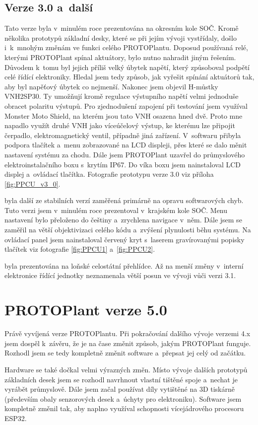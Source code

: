 \subsection{Verze 3.0 a~další}
Tato verze byla v~minulém roce prezentována na okresním kole SOČ.
Kromě několika prototypů základní desky, které se při jejím vývoji vystřídaly, došlo i~k~mnohým změnám ve funkci celého PROTOPlantu.
Doposud používaná relé, kterými PROTOPlant spínal aktuátory, bylo nutno nahradit jiným řešením.
Důvodem k~tomu byl jejich příliš velký úbytek napětí, který způso\-bo\-val podpětí celé řídící elektroniky.
Hledal jsem tedy způsob, jak vyřešit spínání aktuátorů tak, aby byl napěťový úbytek co nejmenší.
Nakonec jsem objevil H-můstky VNH2SP30. 
Ty umožňují kromě regulace výstupního napětí velmi jednoduše obracet polaritu výstupů.
Pro zjednodušení zapojení při testování jsem využíval Monster Moto Shield, na kterém jsou tato VNH osazena hned dvě.
Proto mne napadlo využít druhé VNH jako víceúčelový výstup, ke kterému lze připojit čerpadlo, elektromagnetický ventil, případně jiná zařízení.
V~softwaru přibyla podpora tlačítek a~menu zobrazované na LCD displeji, přes které se dalo měnit nastavení systému za chodu.
Dále jsem PROTOPlant uzavřel do průmyslového elektroinstalačního boxu s~krytím IP67.
Do víka boxu jsem nainstaloval LCD displej a~ovládací tlačítka.
Fotografie prototypu verze 3.0 viz příloha \ref{fig:PPCU_v3_0}.
\newline

\noindent{} byla další ze stabilních verzí zaměřená primárně na opravu softwarových chyb.
Tuto verzi jsem v~minulém roce prezentoval v~krajském kole SOČ.
Menu nastavení bylo přeloženo do češtiny a~zrychlena navigace v~něm.
Dále jsem se zaměřil na větší objektivizaci celého kódu a~zvýšení plynulosti běhu systému.
Na ovládací panel jsem nainstaloval červený kryt s~laserem gravírovanými popisky tlačítek viz fotografie \ref{fig:PPCU1} a~\ref{fig:PPCU2}.
\newline

\noindent{} byla prezentována na loňské celostátní přehlídce.
Až na menší změny v~interní elektronice řídící jednotky neznamenala větší posun ve vývoji vůči verzi 3.1.

\section{PROTOPlant verze 5.0}
Právě vyvíjená verze PROTOPlantu.
Při pokračování dalšího vývoje verzemi 4.x jsem dospěl k~závěru, že je na čase změnit způsob, jakým PROTOPlant funguje.
Rozhodl jsem se tedy kompletně změnit software a~přepsat jej celý od začátku.

Hardware se také dočkal velmi výrazných změn.
Místo vývoje dalších prototypů základních desek jsem se rozhodl navrhnout vlastní tištěné spoje a~nechat je vyrábět průmyslově.
Dále jsem začal používat díly vytištěné na 3D tiskárně (především obaly senzorových desek a~úchyty pro elektroniku).
Software jsem kompletně změnil tak, aby naplno využíval schopnosti vícejádrového procesoru ESP32.

\fxnote[author=PŠ]{\textcolor{mygreen}{Možná přidat něco dalšího k~verzi 5.0?}}

\newpage